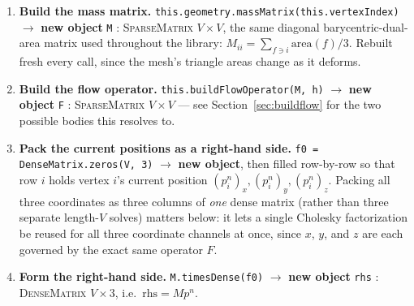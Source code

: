 \documentclass[11pt]{article}
\newcommand{\code}[1]{\texttt{#1}}
\newcommand{\type}[1]{\textsc{#1}}
\begin{document}
\begin{enumerate}[leftmargin=1.6em]
\item \textbf{Build the mass matrix.} \code{this.geometry.massMatrix(this.vertexIndex)}
  $\to$ \textbf{new object} \code{M} : \type{SparseMatrix} $V\times V$, the same diagonal
  barycentric-dual-area matrix used throughout the library:
  $M_{ii}=\sum_{f\ni i}\mathrm{area}(f)/3$. Rebuilt fresh every call, since the mesh's
  triangle areas change as it deforms.

\item \textbf{Build the flow operator.} \code{this.buildFlowOperator(M, h)} $\to$
  \textbf{new object} \code{F} : \type{SparseMatrix} $V\times V$ --- see
  Section~\ref{sec:buildflow} for the two possible bodies this resolves to.

\item \textbf{Pack the current positions as a right-hand side.} \code{f0 =
  DenseMatrix.zeros(V, 3)} $\to$ \textbf{new object}, then filled row-by-row so that row $i$
  holds vertex $i$'s current position $(p_i^n)_x,(p_i^n)_y,(p_i^n)_z$. Packing all three
  coordinates as three columns of \emph{one} dense matrix (rather than three separate
  length-$V$ solves) matters below: it lets a single Cholesky factorization be reused for
  all three coordinate channels at once, since $x$, $y$, and $z$ are each governed by the
  exact same operator $F$.

\item \textbf{Form the right-hand side.} \code{M.timesDense(f0)} $\to$ \textbf{new object}
  \code{rhs} : \type{DenseMatrix} $V\times3$, i.e.\ $\mathrm{rhs}=M p^{n}$.


\end{enumerate}
\end{document}
